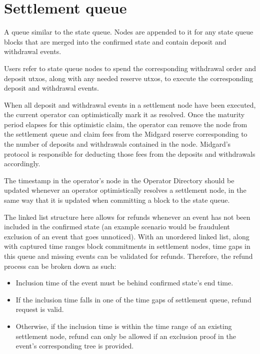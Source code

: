 \documentclass[../midgard.tex]{subfiles}
\begin{document}
\section{Settlement queue}
\label{h:settlement-queue}

A queue similar to the state queue.
Nodes are appended to it for any state queue blocks that are merged into the confirmed state and contain deposit and withdrawal events.

Users refer to state queue nodes to spend the corresponding withdrawal order and deposit utxos, along with any needed reserve utxos, to execute the corresponding deposit and withdrawal events.

When all deposit and withdrawal events in a settlement node have been executed, the current operator can optimistically mark it as resolved.
Once the maturity period elapses for this optimistic claim, the operator can remove the node from the settlement queue and claim fees from the Midgard reserve corresponding to the number of deposits and withdrawals contained in the node.
Midgard's protocol is responsible for deducting those fees from the deposits and withdrawals accordingly.

The timestamp in the operator's node in the Operator Directory should be updated whenever an operator optimistically resolves a settlement node, in the same way that it is updated when committing a block to the state queue.

\todo


The linked list structure here allows for refunds whenever an event has not been included in the confirmed state (an example scenario would be fraudulent exclusion of an event that goes unnoticed). With an unordered linked list, along with captured time ranges block commitments in settlement nodes, time gaps in this queue and missing events can be validated for refunds. Therefore, the refund process can be broken down as such:
\begin{itemize}
  \item Inclusion time of the event must be behind confirmed state's end time.
  \item If the inclusion time falls in one of the time gaps of settlement queue, refund request is valid.
  \item Otherwise, if the inclusion time is within the time range of an existing settlement node, refund can only be allowed if an exclusion proof in the event's corresponding tree is provided.
\end{itemize}
\end{document}
